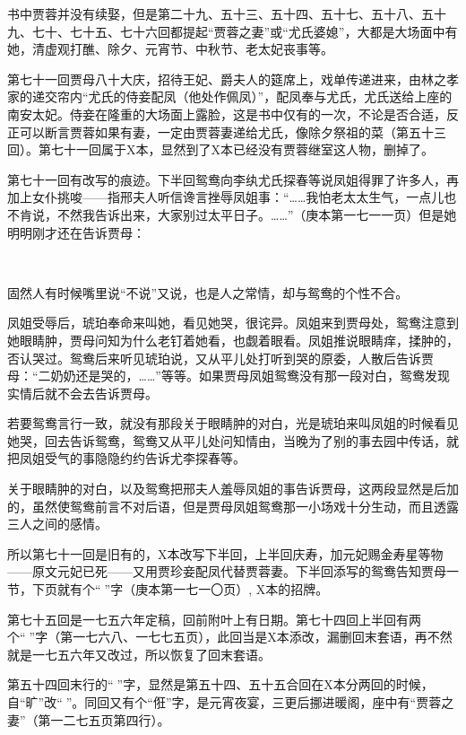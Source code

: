 \par 书中贾蓉并没有续娶，但是第二十九、五十三、五十四、五十七、五十八、五十九、七十、七十五、七十六回都提起“贾蓉之妻”或“尤氏婆媳”，大都是大场面中有她，清虚观打醮、除夕、元宵节、中秋节、老太妃丧事等。
\par 第七十一回贾母八十大庆，招待王妃、爵夫人的筵席上，戏单传递进来，由林之孝家的递交帘内“尤氏的侍妾配凤（他处作佩凤）”，配凤奉与尤氏，尤氏送给上座的南安太妃。侍妾在隆重的大场面上露脸，这是书中仅有的一次，不论是否合适，反正可以断言贾蓉如果有妻，一定由贾蓉妻递给尤氏，像除夕祭祖的菜（第五十三回）。第七十一回属于X本，显然到了X本已经没有贾蓉继室这人物，删掉了。
\par 第七十一回有改写的痕迹。下半回鸳鸯向李纨尤氏探春等说凤姐得罪了许多人，再加上女仆挑唆——指邢夫人听信谗言挫辱凤姐事：“……我怕老太太生气，一点儿也不肯说，不然我告诉出来，大家别过太平日子。……”（庚本第一七一一页）但是她明明刚才还在告诉贾母：
\par  
\par 固然人有时候嘴里说“不说”又说，也是人之常情，却与鸳鸯的个性不合。
\par 凤姐受辱后，琥珀奉命来叫她，看见她哭，很诧异。凤姐来到贾母处，鸳鸯注意到她眼睛肿，贾母问知为什么老钉着她看，也觑着眼看。凤姐推说眼睛痒，揉肿的，否认哭过。鸳鸯后来听见琥珀说，又从平儿处打听到哭的原委，人散后告诉贾母：“二奶奶还是哭的，……”等等。如果贾母凤姐鸳鸯没有那一段对白，鸳鸯发现实情后就不会去告诉贾母。
\par 若要鸳鸯言行一致，就没有那段关于眼睛肿的对白，光是琥珀来叫凤姐的时候看见她哭，回去告诉鸳鸯，鸳鸯又从平儿处问知情由，当晚为了别的事去园中传话，就把凤姐受气的事隐隐约约告诉尤李探春等。
\par 关于眼睛肿的对白，以及鸳鸯把邢夫人羞辱凤姐的事告诉贾母，这两段显然是后加的，虽然使鸳鸯前言不对后语，但是贾母凤姐鸳鸯那一小场戏十分生动，而且透露三人之间的感情。
\par 所以第七十一回是旧有的，X本改写下半回，上半回庆寿，加元妃赐金寿星等物——原文元妃已死——又用贾珍妾配凤代替贾蓉妻。下半回添写的鸳鸯告知贾母一节，下页就有个“𤞘”字（庚本第一七一〇页）, X本的招牌。
\par 第七十五回是一七五六年定稿，回前附叶上有日期。第七十四回上半回有两个“𤞘”字（第一七六八、一七七五页），此回当是X本添改，漏删回末套语，再不然就是一七五六年又改过，所以恢复了回末套语。
\par 第五十四回末行的“𤞘”字，显然是第五十四、五十五合回在X本分两回的时候，自“旷”改“𤞘”。同回又有个“俇”字，是元宵夜宴，三更后挪进暖阁，座中有“贾蓉之妻”（第一二七五页第四行）。
